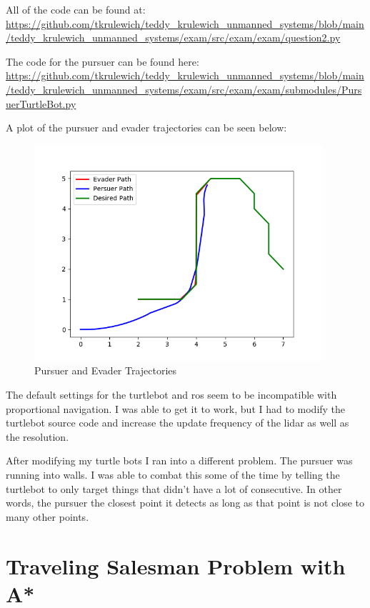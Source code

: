\documentclass{article}
\begin{document}
\bigskip
\noindent  All of the code can be found at: \\
\url{https://github.com/tkrulewich/teddy_krulewich_unmanned_systems/blob/main/teddy_krulewich_unmanned_systems/exam/src/exam/exam/question2.py}

\bigskip
\noindent The code for the pursuer can be found here: \\
\url{https://github.com/tkrulewich/teddy_krulewich_unmanned_systems/blob/main/teddy_krulewich_unmanned_systems/exam/src/exam/exam/submodules/PursuerTurtleBot.py}

\bigskip
\noindent A plot of the pursuer and evader trajectories can be seen below:

\begin{figure}[h]
\centering
\includegraphics[width=0.95\textwidth]{images/intercept.png}
\caption*{Pursuer and Evader Trajectories}
\end{figure}

The default settings for the turtlebot and ros seem to be incompatible with proportional navigation. I was able to get it to work, but I had to modify the turtlebot source code and increase the update frequency of the lidar as well as the resolution.

After modifying my turtle bots I ran into a different problem. The pursuer was running into walls. I was able to combat this some of the time by telling the turtlebot to only target things that didn't have a lot of consecutive. In other words, the pursuer the closest point it detects as long as that point is not close to many other points.

\section{Traveling Salesman Problem with A*}
\end{document}
